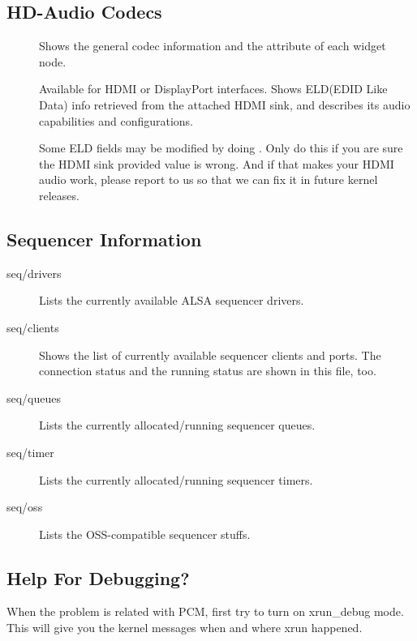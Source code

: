\documentclass[a4paper,8pt,english]{sphinxmanual}
\begin{document}
\subsection{HD-Audio Codecs}
\label{sound/designs/procfile:hd-audio-codecs}\begin{description}
\item[{}] \leavevmode
Shows the general codec information and the attribute of each
widget node.

\item[{}] \leavevmode
Available for HDMI or DisplayPort interfaces.
Shows ELD(EDID Like Data) info retrieved from the attached HDMI sink,
and describes its audio capabilities and configurations.

Some ELD fields may be modified by doing .
Only do this if you are sure the HDMI sink provided value is wrong.
And if that makes your HDMI audio work, please report to us so that we
can fix it in future kernel releases.

\end{description}


\subsection{Sequencer Information}
\label{sound/designs/procfile:sequencer-information}\begin{description}
\item[{seq/drivers}] \leavevmode
Lists the currently available ALSA sequencer drivers.

\item[{seq/clients}] \leavevmode
Shows the list of currently available sequencer clients and
ports.  The connection status and the running status are shown
in this file, too.

\item[{seq/queues}] \leavevmode
Lists the currently allocated/running sequencer queues.

\item[{seq/timer}] \leavevmode
Lists the currently allocated/running sequencer timers.

\item[{seq/oss}] \leavevmode
Lists the OSS-compatible sequencer stuffs.

\end{description}


\subsection{Help For Debugging?}
\label{sound/designs/procfile:help-for-debugging}
When the problem is related with PCM, first try to turn on xrun\_debug
mode.  This will give you the kernel messages when and where xrun
happened.
\end{document}
